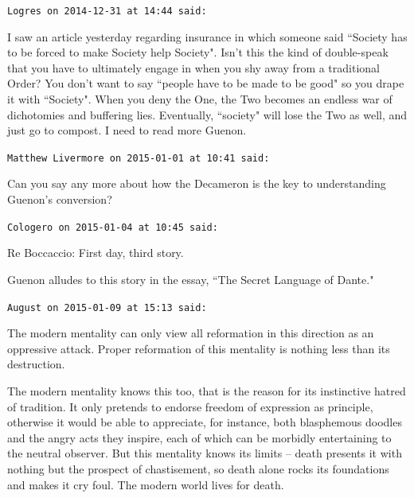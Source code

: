 \begin{footnotesize}\begin{sffamily}



\texttt{Logres on 2014-12-31 at 14:44 said: }

I saw an article yesterday regarding insurance in which someone said ``Society has to be forced to make Society help Society". Isn't this the kind of double-speak that you have to ultimately engage in when you shy away from a traditional Order? You don't want to say ``people have to be made to be good" so you drape it with ``Society". When you deny the One, the Two becomes an endless war of dichotomies and buffering lies. Eventually, ``society" will lose the Two as well, and just go to compost. I need to read more Guenon.


\hfill

\texttt{Matthew Livermore on 2015-01-01 at 10:41 said: }

Can you say any more about how the Decameron is the key to understanding Guenon's conversion?


\hfill

\texttt{Cologero on 2015-01-04 at 10:45 said: }

Re Boccaccio: First day, third story.

Guenon alludes to this story in the essay, ``The Secret Language of Dante."


\hfill

\texttt{August on 2015-01-09 at 15:13 said: }

The modern mentality can only view all reformation in this direction as an oppressive attack. Proper reformation of this mentality is nothing less than its destruction.

The modern mentality knows this too, that is the reason for its instinctive hatred of tradition. It only pretends to endorse freedom of expression as principle, otherwise it would be able to appreciate, for instance, both blasphemous doodles and the angry acts they inspire, each of which can be morbidly entertaining to the neutral observer. But this mentality knows its limits – death presents it with nothing but the prospect of chastisement, so death alone rocks its foundations and makes it cry foul. The modern world lives for death.


\end{sffamily}\end{footnotesize}
